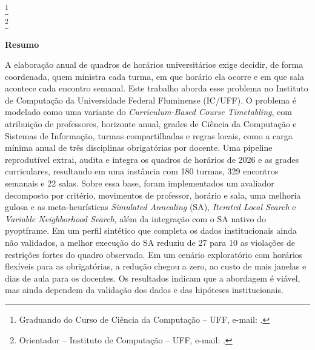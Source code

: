 
\begin{center}
  \begin{singlespace}
    {\LARGE \titulo\par}
    \vspace{0.35cm}
    {\LARGE\itshape \tituloingles\par}
  \end{singlespace}
\end{center}

\vspace{0.4cm}
\begin{flushright}
  \autor\footnote{Graduando do Curso de Ciência da Computação -- UFF, e-mail: .}\\
  \orientador\footnote{Orientador -- Instituto de Computação -- UFF, e-mail: .}
\end{flushright}

\vspace{0.4cm}
\begin{center}
  \textbf{Resumo}
\end{center}

\noindent A elaboração anual de quadros de horários universitários exige decidir, de forma coordenada, quem ministra cada turma, em que horário ela ocorre e em que sala acontece cada encontro semanal. Este trabalho aborda esse problema no Instituto de Computação da Universidade Federal Fluminense (IC/UFF). O problema é modelado como uma variante do \textit{Curriculum-Based Course Timetabling}, com atribuição de professores, horizonte anual, grades de Ciência da Computação e Sistemas de Informação, turmas compartilhadas e regras locais, como a carga mínima anual de três disciplinas obrigatórias por docente. Uma pipeline reprodutível extrai, audita e integra os quadros de horários de 2026 e as grades curriculares, resultando em uma instância com 180 turmas, 329 encontros semanais e 22 salas. Sobre essa base, foram implementados um avaliador decomposto por critério, movimentos de professor, horário e sala, uma melhoria gulosa e as meta-heurísticas \textit{Simulated Annealing} (SA), \textit{Iterated Local Search} e \textit{Variable Neighborhood Search}, além da integração com o SA nativo do pyoptframe. Em um perfil sintético que completa os dados institucionais ainda não validados, a melhor execução do SA reduziu de 27 para 10 as violações de restrições fortes do quadro observado. Em um cenário exploratório com horários flexíveis para as obrigatórias, a redução chegou a zero, ao custo de mais janelas e dias de aula para os docentes. Os resultados indicam que a abordagem é viável, mas ainda dependem da validação dos dados e das hipóteses institucionais. 

